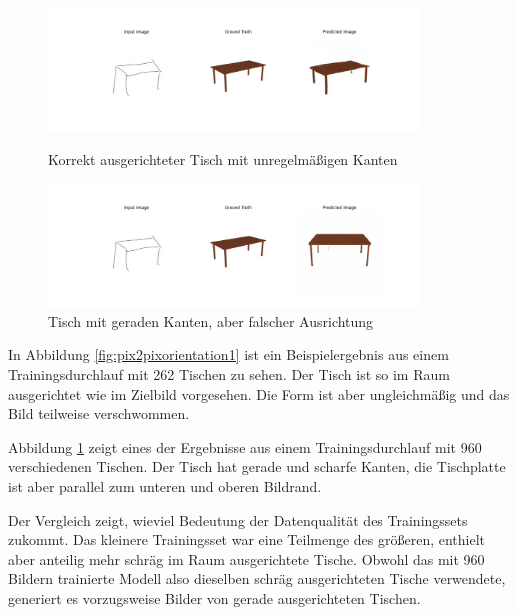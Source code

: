 \begin{figure}[h]
	\centering
	\includegraphics[width=0.875\textwidth]{bilder/pix2pix_progress/table_result_orientation1.png}
  \caption[Tisch ausgerichtet]{Korrekt ausgerichteter Tisch mit unregelmäßigen Kanten}
  \label{fig:pix2pixorientation1}

	\includegraphics[width=0.875\textwidth]{bilder/pix2pix_progress/table_result_orientation2.png}
	\caption[Qualitativ unterschiedliche generierte Tische]{Tisch mit geraden Kanten, aber falscher Ausrichtung}
	\label{fig:pix2pixorientation2}
\end{figure}

In Abbildung \ref{fig:pix2pixorientation1} ist ein Beispielergebnis aus einem Trainingsdurchlauf mit 262 Tischen zu sehen. Der Tisch ist so im Raum ausgerichtet wie im Zielbild vorgesehen. Die Form ist aber ungleichmäßig und das Bild teilweise verschwommen.

Abbildung \ref{fig:pix2pixorientation2} zeigt eines der Ergebnisse aus einem Trainingsdurchlauf mit 960 verschiedenen Tischen. Der Tisch hat gerade und scharfe Kanten, die Tischplatte ist aber parallel zum unteren und oberen Bildrand.

Der Vergleich zeigt, wieviel Bedeutung der Datenqualität des Trainingssets zukommt. Das kleinere Trainingsset war eine Teilmenge des größeren, enthielt aber anteilig mehr schräg im Raum ausgerichtete Tische. Obwohl das mit 960 Bildern trainierte Modell also dieselben schräg ausgerichteten Tische verwendete, generiert es vorzugsweise Bilder von gerade ausgerichteten Tischen.

